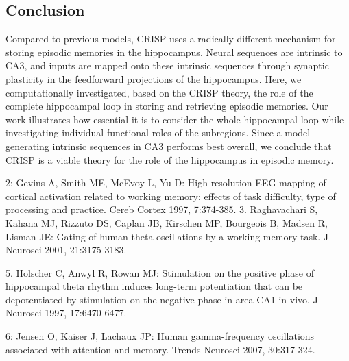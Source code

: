 \documentclass[utf8]{frontiersSCNS} %
\begin{document}




\subsection{Conclusion} 
Compared to previous models, CRISP uses a radically different mechanism for storing episodic memories in the hippocampus. Neural sequences are intrinsic to CA3, and inputs are mapped onto these intrinsic sequences through synaptic plasticity in the feedforward projections of the hippocampus. Here, we computationally investigated, based on the CRISP theory, the role of the complete hippocampal loop in storing and retrieving episodic memories. Our work illustrates how essential it is to consider the whole hippocampal loop while investigating individual functional roles of the subregions. Since a model generating intrinsic sequences in CA3 performs best overall, we conclude that CRISP is a viable theory for the role of the hippocampus in episodic memory.




2: Gevins A, Smith ME, McEvoy L, Yu D: High-resolution EEG mapping of
cortical activation related to working memory: effects of task difficulty,
type of processing and practice. Cereb Cortex 1997, 7:374-385.
3. Raghavachari S, Kahana MJ, Rizzuto DS, Caplan JB, Kirschen MP,
Bourgeois B, Madsen R, Lisman JE: Gating of human theta oscillations by
a working memory task. J Neurosci 2001, 21:3175-3183.

5. Holscher C, Anwyl R, Rowan MJ: Stimulation on the positive phase of
hippocampal theta rhythm induces long-term potentiation that can be
depotentiated by stimulation on the negative phase in area CA1 in vivo.
J Neurosci 1997, 17:6470-6477.

6: Jensen O, Kaiser J, Lachaux JP: Human gamma-frequency oscillations
associated with attention and memory. Trends Neurosci 2007, 30:317-324.




\end{document}
